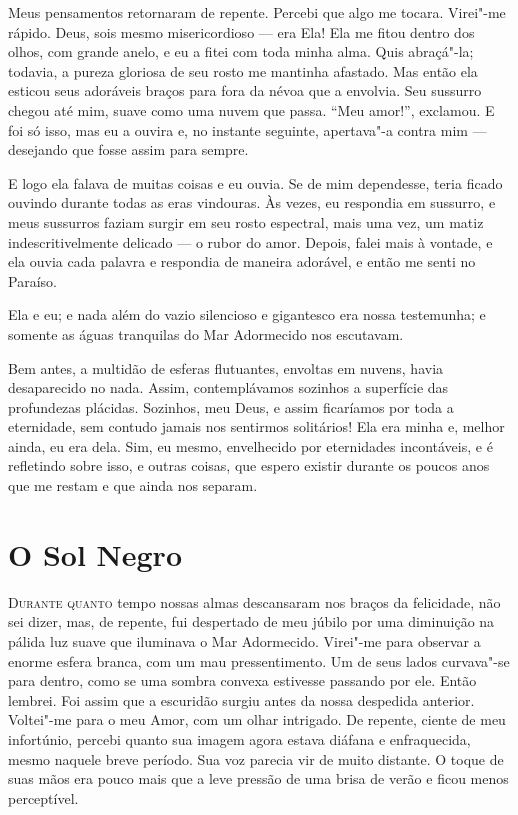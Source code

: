 Meus pensamentos retornaram de repente. Percebi que algo me tocara. Virei"-me rápido. Deus, sois mesmo
misericordioso --- era Ela! Ela me fitou dentro dos olhos, com grande anelo, e eu a fitei com toda minha alma. Quis
abraçá"-la; todavia, a pureza gloriosa de seu rosto me mantinha afastado. Mas então ela esticou seus adoráveis braços
para fora da névoa que a envolvia. Seu sussurro chegou até mim, suave como uma nuvem que passa. “Meu amor!”, exclamou.
E foi só isso, mas eu a ouvira e, no instante seguinte, apertava"-a contra mim --- desejando que fosse assim para sempre.

E logo ela falava de muitas coisas e eu ouvia. Se de mim dependesse, teria ficado ouvindo durante todas as eras
vindouras. Às vezes, eu respondia em sussurro, e meus sussurros faziam surgir em seu rosto espectral, mais uma vez, um
matiz indescritivelmente delicado --- o rubor do amor. Depois, falei mais à vontade, e ela ouvia cada palavra e respondia
de maneira adorável, e então me senti no Paraíso.

Ela e eu; e nada além do vazio silencioso e gigantesco era nossa testemunha; e somente as águas tranquilas do Mar
Adormecido nos escutavam.

Bem antes, a multidão de esferas flutuantes, envoltas em nuvens, havia desaparecido no nada. Assim, contemplávamos
sozinhos a superfície das profundezas plácidas. Sozinhos, meu Deus, e assim ficaríamos por toda a eternidade, sem
contudo jamais nos sentirmos solitários! Ela era minha e, melhor ainda, eu era dela. Sim, eu mesmo, envelhecido por
eternidades incontáveis, e é refletindo sobre isso, e outras coisas, que espero existir durante os poucos anos que me
restam e que ainda nos separam.


\clearpage

\chapter{O Sol Negro}

\textsc{Durante quanto} tempo nossas almas descansaram nos braços da felicidade, não sei dizer, mas, de repente, fui despertado
de meu júbilo por uma diminuição na pálida luz suave que iluminava o Mar Adormecido. Virei"-me para observar a enorme
esfera branca, com um mau pressentimento. Um de seus lados curvava"-se para dentro, como se uma sombra convexa estivesse
passando por ele. Então lembrei. Foi assim que a escuridão surgiu antes da nossa despedida anterior. Voltei"-me para o
meu Amor, com um olhar intrigado. De repente, ciente de meu infortúnio, percebi quanto sua imagem agora estava
diáfana e enfraquecida, mesmo naquele breve período. Sua voz parecia vir de muito distante. O toque de suas mãos era
pouco mais que a leve pressão de uma brisa de verão e ficou menos perceptível.

